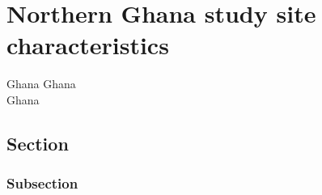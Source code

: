 \chapter{Northern Ghana study site characteristics}
Ghana Ghana \\ Ghana

\section{Section}


\subsection{Subsection}

